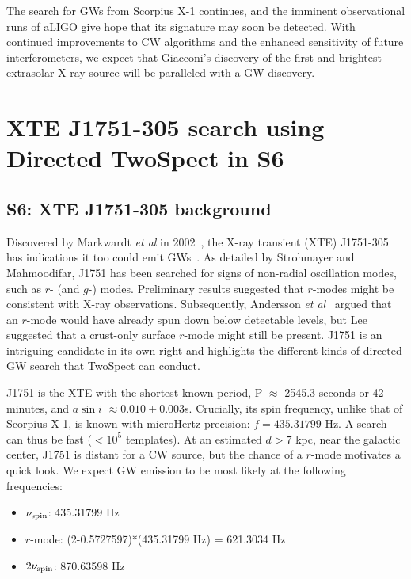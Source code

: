 The search for GWs from Scorpius X-1 continues, and the imminent observational runs of aLIGO give hope that its signature may soon be detected.
With continued improvements to CW algorithms and the enhanced sensitivity of future interferometers, we expect that Giacconi's discovery of the first and brightest extrasolar X-ray source will be paralleled with a GW discovery.

\section{XTE J1751-305 search using Directed TwoSpect in S6}

\subsection{S6: XTE J1751-305 background}

Discovered by Markwardt \textit{et al} in 2002~\cite{Markwardt2002}, the X-ray transient (XTE) J1751-305 has indications it too could emit GWs~\cite{Strohmayer2014}.
As detailed by Strohmayer and Mahmoodifar, J1751 has been searched for signs of non-radial oscillation modes, such as $r$- (and $g$-) modes.
Preliminary results suggested that $r$-modes might be consistent with X-ray observations.
Subsequently, Andersson \textit{et al}~\cite{Andersson2014} argued that an $r$-mode would have already spun down below detectable levels, but Lee~\cite{Lee2014} suggested that a crust-only surface $r$-mode might still be present. 
 J1751 is an intriguing candidate in its own right and highlights the different kinds of directed GW search that TwoSpect can conduct.

J1751 is the XTE with the shortest known period,
P $\approx$$ $ 2545.3 seconds or 42 minutes, and $a \sin i$ $\approx0.010\pm0.003$s.
Crucially, its spin frequency, unlike that of Scorpius X-1, is known with microHertz precision: $f = 435.31799$ Hz.
A search can thus be fast ($< 10^5$ templates).
At an estimated $d > 7$ kpc, near the galactic center, J1751 is distant for a CW source, but the chance of a $r$-mode motivates a quick look.
We expect GW emission to be most likely at the following frequencies:

\begin{itemize}
\item $\nu_\textup{spin}$: 435.31799 Hz
\item $r$-mode: (2-0.5727597)*(435.31799 Hz) = 621.3034 Hz
\item $2\nu_\textup{spin}$: 870.63598 Hz
\end{itemize}

